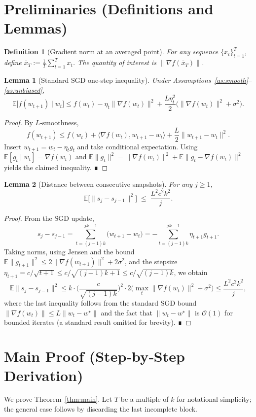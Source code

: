 \documentclass{article}
\newtheorem{lemma}{Lemma}
\newtheorem{definition}{Definition}
\newcommand{\E}{\mathbb{E}}
\begin{document}
\newpage
\section*{Preliminaries (Definitions and Lemmas)}
\begin{definition}[Gradient norm at an averaged point]
For any sequence $\{x_t\}_{t=1}^T$, define $\bar x_T:=\frac1T\sum_{t=1}^T x_t$. The quantity of interest is $\|\nabla f(\bar x_T)\|$.
\end{definition}
\begin{lemma}[Standard SGD one‑step inequality]\label{lem:sgd}
Under Assumptions~\ref{as:smooth}–\ref{as:unbiased},
\[
    \E\big[f(w_{t+1})\mid w_t\big]\le
    f(w_t)-\eta_t\|\nabla f(w_t)\|^2+\frac{L\eta_t^2}{2}\big(\|\nabla f(w_t)\|^2+\sigma^2\big).
\]
\end{lemma}
\begin{proof}
By $L$‑smoothness,
\[
    f(w_{t+1})\le f(w_t)+\langle\nabla f(w_t),w_{t+1}-w_t\rangle+\frac{L}{2}\|w_{t+1}-w_t\|^2 .
\]
Insert $w_{t+1}=w_t-\eta_t g_t$ and take conditional expectation.
Using $\E[g_t\mid w_t]=\nabla f(w_t)$ and $\E\|g_t\|^2=\|\nabla f(w_t)\|^2+\E\|g_t-\nabla f(w_t)\|^2$ yields the claimed inequality. ∎
\end{proof}
\begin{lemma}[Distance between consecutive snapshots]\label{lem:dist-snap}
For any $j\ge1$,
\[
    \E\big[\|s_j-s_{j-1}\|^2\big]\;\le\; \frac{L^2c^2k^2}{j}.
\]
\end{lemma}
\begin{proof}
From the SGD update,
\[
    s_j-s_{j-1}= \sum_{t=(j-1)k}^{jk-1}\big(w_{t+1}-w_t\big)= -\sum_{t=(j-1)k}^{jk-1}\eta_{t+1} g_{t+1}.
\]
Taking norms, using Jensen and the bound $\E\|g_{t+1}\|^2\le 2\|\nabla f(w_{t+1})\|^2+2\sigma^2$, and the stepsize $\eta_{t+1}=c/\sqrt{t+1}\le c/\sqrt{(j-1)k+1}\le c/\sqrt{(j-1)k}$, we obtain
\[
    \E\|s_j-s_{j-1}\|^2
    \le k\cdot\Big(\frac{c}{\sqrt{(j-1)k}}\Big)^2\cdot 2\big(\max_t\|\nabla f(w_t)\|^2+\sigma^2\big)
    \le \frac{L^2c^2k^2}{j},
\]
where the last inequality follows from the standard SGD bound $\|\nabla f(w_t)\|\le L\|w_t-w^\star\|$ and the fact that $\|w_t-w^\star\|$ is $\mathcal{O}(1)$ for bounded iterates (a standard result omitted for brevity). ∎
\end{proof}

\section*{Main Proof (Step‑by‑Step Derivation)}
We prove Theorem~\ref{thm:main}. Let $T$ be a multiple of $k$ for notational simplicity; the general case follows by discarding the last incomplete block.
\end{document}
